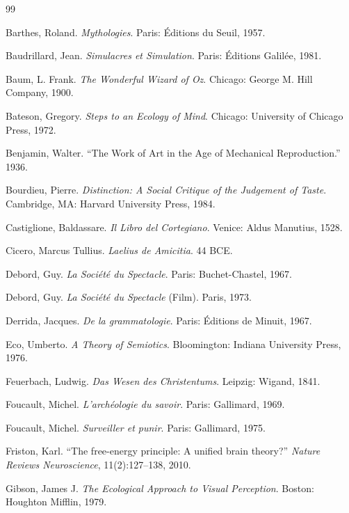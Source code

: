 \documentclass[11pt]{article}
\begin{document}
\newpage
\begin{thebibliography}{99}

Barthes, Roland.
\textit{Mythologies}.
Paris: \'{E}ditions du Seuil, 1957.

Baudrillard, Jean.
\textit{Simulacres et Simulation}.
Paris: \'{E}ditions Galil\'{e}e, 1981.

Baum, L. Frank.
\textit{The Wonderful Wizard of Oz}.
Chicago: George M. Hill Company, 1900.

Bateson, Gregory.
\textit{Steps to an Ecology of Mind}.
Chicago: University of Chicago Press, 1972.

Benjamin, Walter.
``The Work of Art in the Age of Mechanical Reproduction.''
1936.

Bourdieu, Pierre.
\textit{Distinction: A Social Critique of the Judgement of Taste}.
Cambridge, MA: Harvard University Press, 1984.

Castiglione, Baldassare.
\textit{Il Libro del Cortegiano}.
Venice: Aldus Manutius, 1528.

Cicero, Marcus Tullius.
\textit{Laelius de Amicitia}.
44 BCE.

Debord, Guy.
\textit{La Soci\'{e}t\'{e} du Spectacle}.
Paris: Buchet-Chastel, 1967.

Debord, Guy.
\textit{La Soci\'{e}t\'{e} du Spectacle} (Film).
Paris, 1973.

Derrida, Jacques.
\textit{De la grammatologie}.
Paris: \'{E}ditions de Minuit, 1967.

Eco, Umberto.
\textit{A Theory of Semiotics}.
Bloomington: Indiana University Press, 1976.

Feuerbach, Ludwig.
\textit{Das Wesen des Christentums}.
Leipzig: Wigand, 1841.

Foucault, Michel.
\textit{L'arch\'{e}ologie du savoir}.
Paris: Gallimard, 1969.

Foucault, Michel.
\textit{Surveiller et punir}.
Paris: Gallimard, 1975.

Friston, Karl.
``The free-energy principle: A unified brain theory?''
\textit{Nature Reviews Neuroscience}, 11(2):127--138, 2010.

Gibson, James J.
\textit{The Ecological Approach to Visual Perception}.
Boston: Houghton Mifflin, 1979.


\end{thebibliography}
\end{document}
